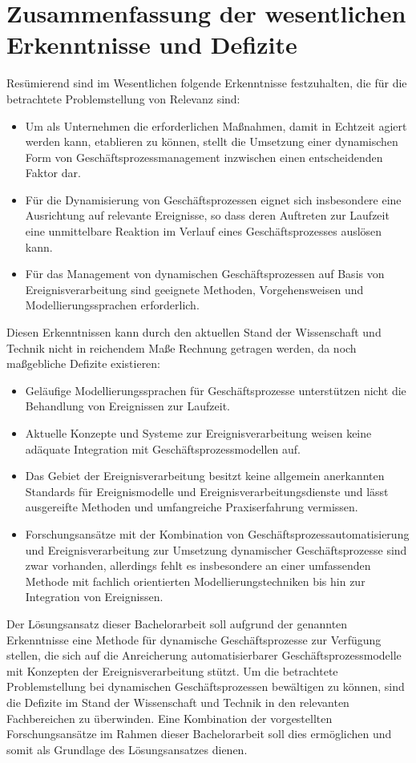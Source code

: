 \section{Zusammenfassung der wesentlichen Erkenntnisse und Defizite}\label{sec:grundlagensummary}

Resümierend sind im Wesentlichen folgende Erkenntnisse festzuhalten, die für die betrachtete Problemstellung von Relevanz sind:
\begin{itemize}
	\item 
	Um als Unternehmen die erforderlichen Maßnahmen, damit in Echtzeit agiert werden kann, etablieren zu können, stellt die Umsetzung einer dynamischen Form von Geschäftsprozessmanagement inzwischen einen entscheidenden Faktor dar.
    \item 
    Für die Dynamisierung von Geschäftsprozessen eignet sich insbesondere eine Ausrichtung auf relevante Ereignisse, so dass deren Auftreten zur Laufzeit eine unmittelbare Reaktion im Verlauf eines Geschäftsprozesses auslösen kann.
    \item
    Für das Management von dynamischen Geschäftsprozessen auf Basis von Ereignisverarbeitung sind geeignete Methoden, Vorgehensweisen und Modellierungssprachen erforderlich.
\end{itemize}

Diesen Erkenntnissen kann durch den aktuellen Stand der Wissenschaft und Technik nicht in
reichendem Maße Rechnung getragen werden, da noch maßgebliche Defizite existieren:
\begin{itemize}
	\item
	Geläufige Modellierungssprachen für Geschäftsprozesse unterstützen nicht die Behandlung von Ereignissen zur Laufzeit.
    \item 
    Aktuelle Konzepte und Systeme zur Ereignisverarbeitung weisen keine adäquate Integration mit Geschäftsprozessmodellen auf.
    \item
    Das Gebiet der Ereignisverarbeitung besitzt keine allgemein anerkannten Standards für Ereignismodelle und Ereignisverarbeitungsdienste und lässt ausgereifte Methoden und umfangreiche Praxiserfahrung vermissen.
    \item
    Forschungsansätze mit der Kombination von Geschäftsprozessautomatisierung und Ereignisverarbeitung zur Umsetzung dynamischer Geschäftsprozesse sind zwar vorhanden, allerdings fehlt es insbesondere an einer umfassenden Methode mit fachlich orientierten Modellierungstechniken bis hin zur Integration von Ereignissen.
\end{itemize}

Der Lösungsansatz dieser Bachelorarbeit soll aufgrund der genannten Erkenntnisse eine Methode für dynamische Geschäftsprozesse zur Verfügung stellen, die sich auf die Anreicherung automatisierbarer Geschäftsprozessmodelle mit Konzepten der Ereignisverarbeitung stützt. 
Um die betrachtete Problemstellung bei dynamischen Geschäftsprozessen bewältigen zu können, sind die Defizite im Stand der Wissenschaft und Technik in den relevanten Fachbereichen zu überwinden. Eine Kombination der vorgestellten Forschungsansätze im Rahmen dieser Bachelorarbeit soll dies ermöglichen und somit als Grundlage des Lösungsansatzes dienen.